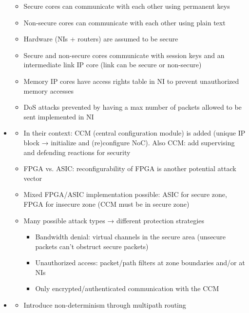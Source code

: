 \begin{itemize}
\begin{itemize}
            \item Secure cores can communicate with each other using permanent keys
            \item Non-secure cores can communicate with each other using plain text
            \item Hardware (NIs + routers) are assumed to be secure
            \item Secure and non-secure cores communicate with session keys and an intermediate link IP core (link can be secure or non-secure)
            \item Memory IP cores have access rights table in NI to prevent unauthorized memory accesses
            \item DoS attacks prevented by having a max number of packets allowed to be sent implemented in NI
        \end{itemize}
    \item \textbf{}
        \begin{itemize}
            \item In their context: CCM (central configuration module) is added (unique IP block → initialize and (re)configure NoC). Also CCM:
                add supervising and defending reactions for security
            \item FPGA vs. ASIC: reconfigurability of FPGA is another potential attack vector
            \item Mixed FPGA/ASIC implementation possible: ASIC for secure zone, FPGA for insecure zone (CCM must be in secure zone)
            \item Many possible attack types → different protection strategies
                \begin{itemize}
                    \item Bandwidth denial: virtual channels in the secure area (unsecure packets can't obstruct secure packets)
                    \item Unauthorized access: packet/path filters at zone boundaries and/or at NIs
                    \item Only encrypted/authenticated communication with the CCM
                \end{itemize}
        \end{itemize}
    \item \textbf{}
        \begin{itemize}
            \item Introduce non-determinism through multipath routing

\end{itemize}
\end{itemize}
